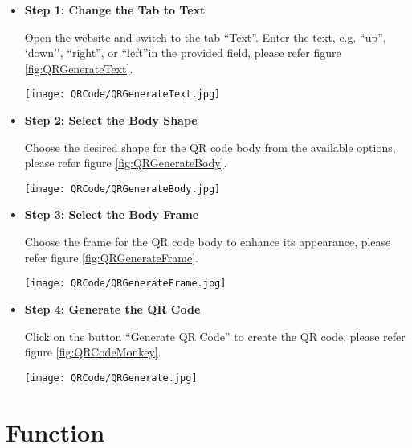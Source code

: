 \begin{itemize}
	\item \textbf{Step 1: Change the Tab to Text} 
	
	Open the website and switch to the tab ``Text''. Enter the text, e.g.  ``up'', `down'', ``right'', or ``left''in the provided field, please refer figure \ref{fig:QRGenerateText}.
	
	\begin{center}
		\texttt{[image: QRCode/QRGenerateText.jpg]}
		\label{fig:QRGenerateText}
	\end{center}
	
	\item \textbf{Step 2: Select the Body Shape} 
	
	Choose the desired shape for the QR code body from the available options, please refer figure \ref{fig:QRGenerateBody}.
	
	\begin{center}
		\texttt{[image: QRCode/QRGenerateBody.jpg]}
		\label{fig:QRGenerateBody}
	\end{center}
	
	\item \textbf{Step 3: Select the Body Frame} 
	
	Choose the frame for the QR code body to enhance its appearance, please refer figure \ref{fig:QRGenerateFrame}.
	
	\begin{center}
		\texttt{[image: QRCode/QRGenerateFrame.jpg]}
		\label{fig:QRGenerateFrame}
	\end{center}
	
	\item \textbf{Step 4: Generate the QR Code} 
	
	Click on the button ``Generate QR Code'' to create the QR code, please refer figure \ref{fig:QRCodeMonkey}.
	
	\begin{center}
		\texttt{[image: QRCode/QRGenerate.jpg]}
		\label{fig:QRCodeMonkey}
	\end{center}
\end{itemize}



\section{Function}


